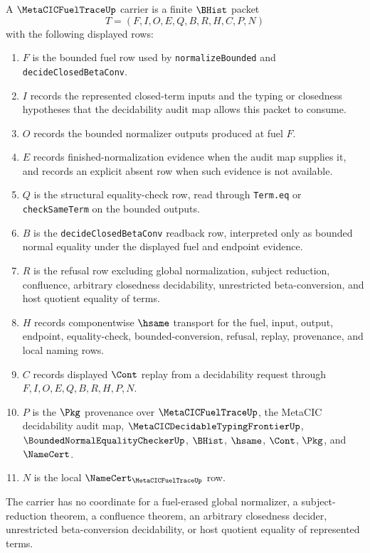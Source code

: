 \begin{definition}
\label{def:metacic-fuel-trace-carrier}
A $\MetaCICFuelTraceUp$ carrier is a finite $\BHist$ packet
$$
T=(F,I,O,E,Q,B,R,H,C,P,N)
$$
with the following displayed rows:
\begin{enumerate}
\item $F$ is the bounded fuel row used by \texttt{normalizeBounded} and \texttt{decideClosedBetaConv}.
\item $I$ records the represented closed-term inputs and the typing or closedness hypotheses that the decidability audit map allows this packet to consume.
\item $O$ records the bounded normalizer outputs produced at fuel $F$.
\item $E$ records finished-normalization evidence when the audit map supplies it, and records an explicit absent row when such evidence is not available.
\item $Q$ is the structural equality-check row, read through \texttt{Term.eq} or \texttt{checkSameTerm} on the bounded outputs.
\item $B$ is the \texttt{decideClosedBetaConv} readback row, interpreted only as bounded normal equality under the displayed fuel and endpoint evidence.
\item $R$ is the refusal row excluding global normalization, subject reduction, confluence, arbitrary closedness decidability, unrestricted beta-conversion, and host quotient equality of terms.
\item $H$ records componentwise $\hsame$ transport for the fuel, input, output, endpoint, equality-check, bounded-conversion, refusal, replay, provenance, and local naming rows.
\item $C$ records displayed $\Cont$ replay from a decidability request through $F,I,O,E,Q,B,R,H,P,N$.
\item $P$ is the $\Pkg$ provenance over $\MetaCICFuelTraceUp$, the MetaCIC decidability audit map, $\MetaCICDecidableTypingFrontierUp$, $\BoundedNormalEqualityCheckerUp$, $\BHist$, $\hsame$, $\Cont$, $\Pkg$, and $\NameCert$.
\item $N$ is the local $\NameCert_{\MetaCICFuelTraceUp}$ row.
\end{enumerate}
The carrier has no coordinate for a fuel-erased global normalizer, a subject-reduction theorem, a confluence theorem, an arbitrary closedness decider, unrestricted beta-conversion decidability, or host quotient equality of represented terms.
\end{definition}

